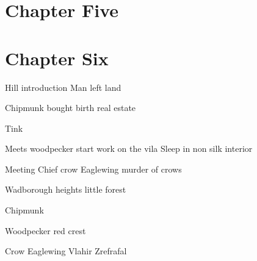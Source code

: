 \documentclass[smalldemyvopaper,11pt,twoside,onecolumn,openright,extrafontsizes]{memoir}
\begin{document}
\chapter{Chapter Five}

\chapter{Chapter Six}



 Hill introduction Man left land

 Chipmunk bought birth real estate
 
 Tink

 Meets woodpecker start work on the vila
 Sleep in non silk interior

Meeting Chief crow Eaglewing murder of crows

Wadborough heights little forest 

Chipmunk 

Woodpecker 
red crest

Crow Eaglewing
Vlahir
Zrefrafal

\end{document}
